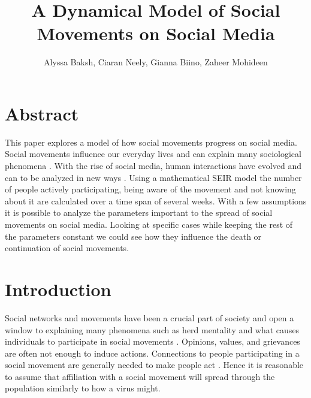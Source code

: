 \documentclass{article}
\title{A Dynamical Model of Social Movements on Social Media}
\author{
    Alyssa Baksh, 
    Ciaran Neely,
    Gianna Biino,
    Zaheer Mohideen
}
\begin{document}
    \maketitle

    \section{Abstract}
    This paper explores a model of how social movements progress on social media. Social movements influence our everyday lives and can explain many sociological phenomena \cite{diani_networks_2013}. With the rise of social media, human interactions have evolved and can to be analyzed in new ways \cite{kidd_social_2016}. Using a mathematical SEIR model the number of people actively participating, being aware of the movement and not knowing about it are calculated over a time span of several weeks. With a few assumptions it is possible to analyze the parameters important to the spread of social movements on social media. Looking at specific cases while keeping the rest of the parameters constant we could see how they influence the death or continuation of social movements. 
    
    \section{Introduction}
    Social networks and movements have been a crucial part of society and open a window to explaining many phenomena such as herd mentality and what causes individuals to participate in social movements \cite{diani_networks_2013}. Opinions, values, and grievances are often not enough to induce actions. Connections to people participating in a social movement are generally needed to make people act \cite{small_movements_2021}. Hence it is reasonable to assume that affiliation with a social movement will spread through the population similarly to how a virus might.
    
\end{document}
